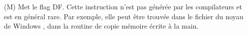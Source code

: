   \item[STD] (M) Met le flag DF.
   Cette instruction n'est pas générée par les compilateurs et est en général rare.
   Par exemple, elle peut être trouvée dans le fichier du noyau de Windows ,
   dans la routine de copie mémoire écrite à la main.
